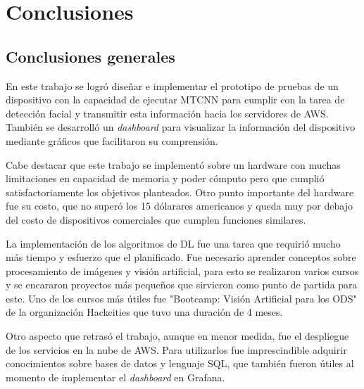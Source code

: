 
\chapter{Conclusiones} %

\label{Chapter5} %




\section{Conclusiones generales }
En este trabajo se logró diseñar e implementar el prototipo de pruebas de un dispositivo con la capacidad de ejecutar MTCNN para cumplir con la tarea de detección facial y transmitir esta información hacia los servidores de AWS. También se desarrolló un \textit{dashboard} para visualizar la información del dispositivo mediante gráficos que facilitaron su comprensión.

Cabe destacar que este trabajo se implementó sobre un hardware con muchas limitaciones en capacidad de memoria y poder cómputo pero que cumplió satisfactoriamente los objetivos planteados. Otro punto importante del hardware fue su costo, que no superó los 15 dólarares americanos y queda muy por debajo del costo de dispositivos comerciales que cumplen funciones similares.

La implementación de los algoritmos de DL fue una tarea que requirió mucho más tiempo y esfuerzo que el planificado. Fue necesario aprender conceptos sobre procesamiento de imágenes y visión artificial, para esto se realizaron varios cursos y se encararon proyectos más pequeños que sirvieron como punto de partida para este. Uno de los cursos más útiles fue "Bootcamp: Visión Artificial para los ODS" de la organización Hackcities que tuvo una duración de 4 meses.

Otro aspecto que retrasó el trabajo, aunque en menor medida, fue el despliegue de los servicios en la nube de AWS. Para utilizarlos fue imprescindible adquirir conocimientos sobre bases de datos y lenguaje SQL, que también fueron útiles al momento de implementar el \textit{dashboard} en Grafana.

